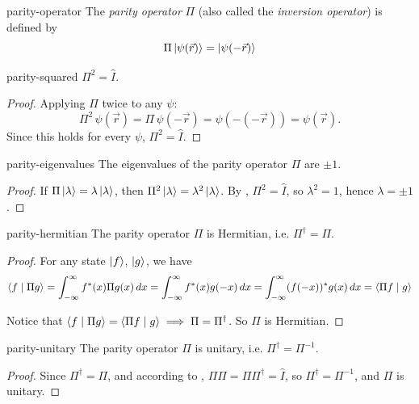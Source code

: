 \documentclass[12pt]{article}
\begin{document}
\begin{dfn}
{parity-operator}
  The \emph{parity operator} $\Pi$ (also called the \emph{inversion operator}) is defined by
  \[ \Pi \ket{\psi(\vec r)} = \ket{\psi(-\vec r)} \]
\end{dfn}

\begin{thm}{parity-squared}
  $\Pi^2 = \hat{I}$.
\end{thm}

\begin{proof}
  Applying $\Pi$ twice to any $\psi$:
  \[\Pi^2\,\psi(\vec r) = \Pi\,\psi(-\vec r) = \psi(-(-\vec r)) = \psi(\vec r).\]
  Since this holds for every $\psi$, $\Pi^2 = \hat{I}$.
\end{proof}

\begin{thm}{parity-eigenvalues}
  The eigenvalues of the parity operator $\Pi$ are $\pm 1$.
\end{thm}

\begin{proof}
  If $\Pi\ket{\lambda} = \lambda\ket{\lambda}$, then $\Pi^2\ket{\lambda} = \lambda^2\ket{\lambda}$. By , $\Pi^2 = \hat{I}$, so $\lambda^2 = 1$, hence $\lambda = \pm 1$.
\end{proof}

\begin{thm}{parity-hermitian}
  The parity operator $\Pi$ is Hermitian, i.e. $\Pi^{\dagger} = \Pi$.
\end{thm}

\begin{proof}
  For any state $\ket{f}$, $\ket{g}$, we have
  \[\braket{f \mid \Pi g} = \int_{-\infty}^{\infty} f^*(x) \Pi g(x) \, dx = \int_{-\infty}^{\infty} f^*(x) g(-x) \, dx = \int_{-\infty}^{\infty} (f(-x))^* g(x) \, dx = \braket{\Pi f \mid g}\]

  Notice that $\braket{f \mid \Pi g} = \braket{\Pi f \mid g} \implies \Pi = \Pi^{\dagger}$. So $\Pi$ is Hermitian. 
\end{proof}

\begin{thm}{parity-unitary}
  The parity operator $\Pi$ is unitary, i.e. $\Pi^{\dagger} = \Pi^{-1}$.
\end{thm}

\begin{proof}
  Since $\Pi^{\dagger} = \Pi$, and according to , $\Pi \Pi = \Pi \Pi^{\dagger} = \hat{I}$, so $\Pi^{\dagger} = \Pi^{-1}$, and $\Pi$ is unitary. 
\end{proof}
\end{document}
